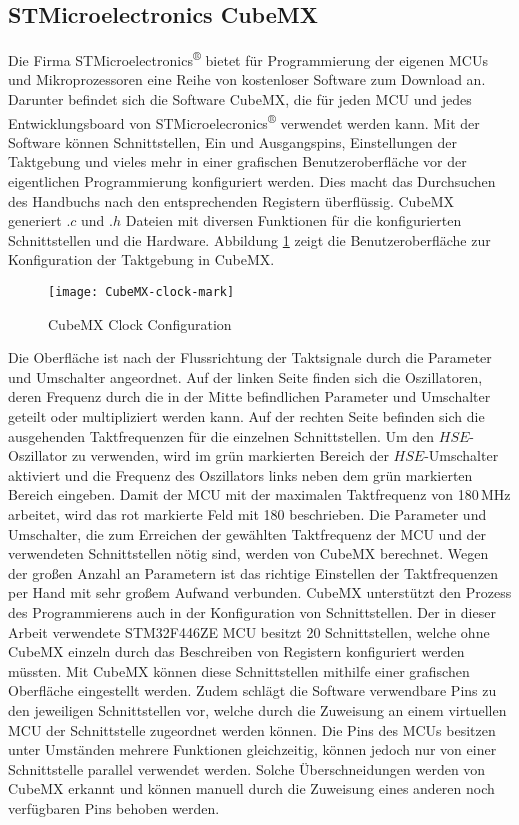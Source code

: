 
\subsection{STMicroelectronics CubeMX}
Die Firma STMicroelectronics\textsuperscript{®} bietet für Programmierung der eigenen MCUs und Mikroprozessoren eine Reihe von kostenloser Software zum Download an. Darunter befindet sich die Software CubeMX, die für jeden MCU und jedes Entwicklungsboard von STMicroelecronics\textsuperscript{®} verwendet werden kann. Mit der Software können Schnittstellen, Ein und Ausgangspins, Einstellungen der Taktgebung und vieles mehr in einer grafischen Benutzeroberfläche vor der eigentlichen Programmierung konfiguriert werden. Dies macht das Durchsuchen des Handbuchs nach den entsprechenden Registern überflüssig. CubeMX generiert $.c$ und $.h$ Dateien mit diversen Funktionen für die konfigurierten Schnittstellen und die Hardware. 
Abbildung \ref{fig:CubeMXClock} zeigt die Benutzeroberfläche zur Konfiguration der Taktgebung in CubeMX. 
\begin{figure}[h]
	\centering
	\texttt{[image: CubeMX-clock-mark]}
	\caption{CubeMX Clock Configuration}
	\label{fig:CubeMXClock}
\end{figure}
Die Oberfläche ist nach der Flussrichtung der Taktsignale durch die Parameter und Umschalter angeordnet. Auf der linken Seite finden sich die Oszillatoren, deren Frequenz durch die in der Mitte befindlichen Parameter und Umschalter geteilt oder multipliziert werden kann. Auf der rechten Seite befinden sich die ausgehenden Taktfrequenzen für die einzelnen Schnittstellen. Um den $HSE$-Oszillator zu verwenden, wird im grün markierten Bereich der $HSE$-Umschalter aktiviert und die Frequenz des Oszillators links neben dem grün markierten Bereich eingeben. Damit der MCU mit der maximalen Taktfrequenz von 180\,MHz arbeitet, wird das rot markierte Feld mit 180 beschrieben. Die Parameter und Umschalter, die zum Erreichen der gewählten Taktfrequenz der MCU und der verwendeten Schnittstellen nötig sind, werden von CubeMX berechnet. Wegen der großen Anzahl an Parametern ist das richtige Einstellen der Taktfrequenzen per Hand mit sehr großem Aufwand verbunden. CubeMX unterstützt den Prozess des Programmierens auch in der Konfiguration von Schnittstellen. Der in dieser Arbeit verwendete STM32F446ZE MCU besitzt 20 Schnittstellen, welche ohne CubeMX einzeln durch das Beschreiben von Registern konfiguriert werden müssten. Mit CubeMX können diese Schnittstellen mithilfe einer grafischen Oberfläche eingestellt werden. Zudem schlägt die Software verwendbare Pins zu den jeweiligen Schnittstellen vor, welche durch die Zuweisung an einem virtuellen MCU der Schnittstelle zugeordnet werden können. Die Pins des MCUs besitzen unter Umständen mehrere Funktionen gleichzeitig, können jedoch nur von einer Schnittstelle parallel verwendet werden. Solche Überschneidungen werden von CubeMX erkannt und können manuell durch die Zuweisung eines anderen noch verfügbaren Pins behoben werden.
